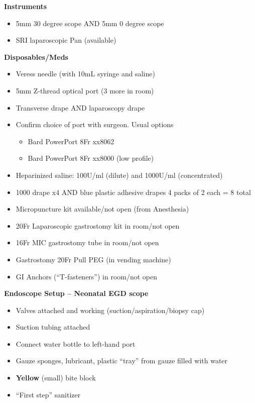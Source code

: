\documentclass[
  letterpaper,
]{scrbook}
\providecommand{\tightlist}{%
  \setlength{\itemsep}{0pt}\setlength{\parskip}{0pt}}
\begin{document}
\textbf{Instruments}

\begin{itemize}
\tightlist
\item
  5mm 30 degree scope AND 5mm 0 degree scope
\item
  SRI laparoscopic Pan (available)
\end{itemize}

\textbf{Disposables/Meds}

\begin{itemize}
\tightlist
\item
  Veress needle (with 10mL syringe and saline)
\item
  5mm Z-thread optical port (3 more in room)
\item
  Transverse drape AND laparoscopy drape
\item
  Confirm choice of port with surgeon. Usual options

  \begin{itemize}
  \tightlist
  \item
    Bard PowerPort 8Fr xx8062
  \item
    Bard PowerPort 8Fr xx8000 (low profile)
  \end{itemize}
\item
  Heparinized saline: 100U/ml (dilute) and 1000U/ml (concentrated)
\item
  1000 drape x4 AND blue plastic adhesive drapes 4 packs of 2 each = 8
  total
\item
  Micropuncture kit available/not open (from Anesthesia)
\item
  20Fr Laparoscopic gastrostomy kit in room/not open
\item
  16Fr MIC gastrostomy tube in room/not open
\item
  Gastrostomy 20Fr Pull PEG (in vending machine)
\item
  GI Anchors (``T-fasteners'') in room/not open
\end{itemize}

\textbf{Endoscope Setup -- Neonatal EGD scope}

\begin{itemize}
\tightlist
\item
  Valves attached and working (suction/aspiration/biopsy cap)
\item
  Suction tubing attached
\item
  Connect water bottle to left-hand port
\item
  Gauze sponges, lubricant, plastic ``tray'' from gauze filled with
  water
\item
  \textbf{Yellow} (small) bite block
\item
  ``First step'' sanitizer
\end{itemize}
\end{document}

